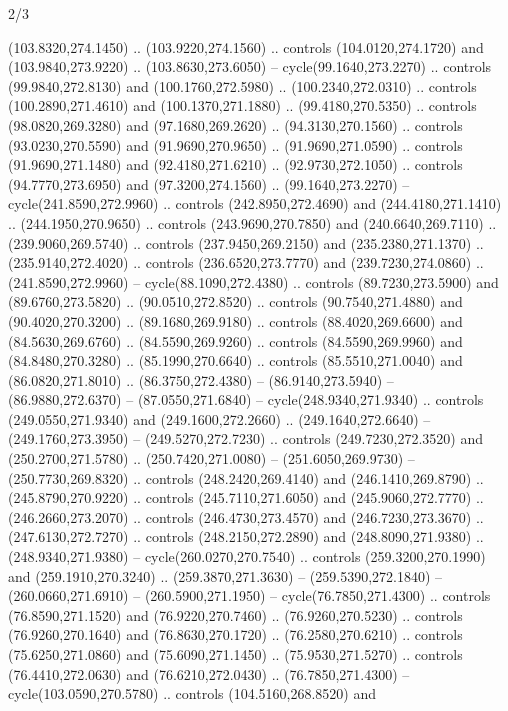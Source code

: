 \begin{flagdescription}{2/3}
\begin{scope}[xshift=0.5\flaglength,yshift=0.5\flagwidth,scale=\stretchfactor]
\begin{scope}[scale=0.001645\flagwidth,yshift=65mm,xshift=-63mm]
\begin{scope}[y=0.80pt, x=0.80pt, yscale=-1,]
\begin{scope}[cm={{1.33333,0.0,0.0,1.33333,(0.0,1e-05)}}]
  (103.8320,274.1450) .. (103.9220,274.1560) .. controls (104.0120,274.1720) and
  (103.9840,273.9220) .. (103.8630,273.6050) -- cycle(99.1640,273.2270) ..
  controls (99.9840,272.8130) and (100.1760,272.5980) .. (100.2340,272.0310) ..
  controls (100.2890,271.4610) and (100.1370,271.1880) .. (99.4180,270.5350) ..
  controls (98.0820,269.3280) and (97.1680,269.2620) .. (94.3130,270.1560) ..
  controls (93.0230,270.5590) and (91.9690,270.9650) .. (91.9690,271.0590) ..
  controls (91.9690,271.1480) and (92.4180,271.6210) .. (92.9730,272.1050) ..
  controls (94.7770,273.6950) and (97.3200,274.1560) .. (99.1640,273.2270) --
  cycle(241.8590,272.9960) .. controls (242.8950,272.4690) and
  (244.4180,271.1410) .. (244.1950,270.9650) .. controls (243.9690,270.7850) and
  (240.6640,269.7110) .. (239.9060,269.5740) .. controls (237.9450,269.2150) and
  (235.2380,271.1370) .. (235.9140,272.4020) .. controls (236.6520,273.7770) and
  (239.7230,274.0860) .. (241.8590,272.9960) -- cycle(88.1090,272.4380) ..
  controls (89.7230,273.5900) and (89.6760,273.5820) .. (90.0510,272.8520) ..
  controls (90.7540,271.4880) and (90.4020,270.3200) .. (89.1680,269.9180) ..
  controls (88.4020,269.6600) and (84.5630,269.6760) .. (84.5590,269.9260) ..
  controls (84.5590,269.9960) and (84.8480,270.3280) .. (85.1990,270.6640) ..
  controls (85.5510,271.0040) and (86.0820,271.8010) .. (86.3750,272.4380) --
  (86.9140,273.5940) -- (86.9880,272.6370) -- (87.0550,271.6840) --
  cycle(248.9340,271.9340) .. controls (249.0550,271.9340) and
  (249.1600,272.2660) .. (249.1640,272.6640) -- (249.1760,273.3950) --
  (249.5270,272.7230) .. controls (249.7230,272.3520) and (250.2700,271.5780) ..
  (250.7420,271.0080) -- (251.6050,269.9730) -- (250.7730,269.8320) .. controls
  (248.2420,269.4140) and (246.1410,269.8790) .. (245.8790,270.9220) .. controls
  (245.7110,271.6050) and (245.9060,272.7770) .. (246.2660,273.2070) .. controls
  (246.4730,273.4570) and (246.7230,273.3670) .. (247.6130,272.7270) .. controls
  (248.2150,272.2890) and (248.8090,271.9380) .. (248.9340,271.9380) --
  cycle(260.0270,270.7540) .. controls (259.3200,270.1990) and
  (259.1910,270.3240) .. (259.3870,271.3630) -- (259.5390,272.1840) --
  (260.0660,271.6910) -- (260.5900,271.1950) -- cycle(76.7850,271.4300) ..
  controls (76.8590,271.1520) and (76.9220,270.7460) .. (76.9260,270.5230) ..
  controls (76.9260,270.1640) and (76.8630,270.1720) .. (76.2580,270.6210) ..
  controls (75.6250,271.0860) and (75.6090,271.1450) .. (75.9530,271.5270) ..
  controls (76.4410,272.0630) and (76.6210,272.0430) .. (76.7850,271.4300) --
  cycle(103.0590,270.5780) .. controls (104.5160,268.8520) and

\end{scope}
\end{scope}
\end{scope}
\end{scope}
\end{flagdescription}
